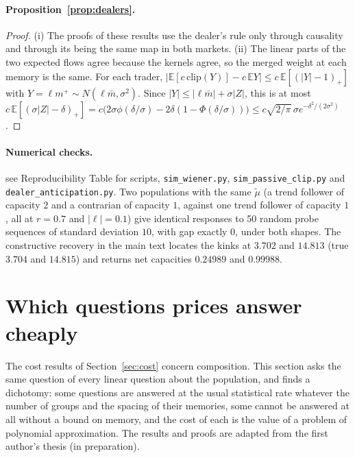 \documentclass[12pt]{article}
\theoremstyle{definition}
\theoremstyle{remark}
\begin{document}
\paragraph{Proposition~\ref{prop:dealers}.}
\begin{proof}
(i) The proofs of these results use the dealer's rule only through causality and through its being the same map in both markets. (ii) The linear parts of the two expected flows agree because the kernels agree, so the merged weight at each memory is the same. For each trader, $|\mathbb E[c\,\mathrm{clip}(Y)]-c\,\mathbb EY|\le c\,\mathbb E[(|Y|-1)_+]$ with $Y=\ell m^+\sim N(\ell\bar m,\sigma^2)$. Since $|Y|\le|\ell\bar m|+\sigma|Z|$, this is at most $c\,\mathbb E[(\sigma|Z|-\delta)_+]=c\bigl(2\sigma\phi(\delta/\sigma)-2\delta(1-\Phi(\delta/\sigma))\bigr)\le c\sqrt{2/\pi}\,\sigma e^{-\delta^2/(2\sigma^2)}$.
\end{proof}

\paragraph{Numerical checks.} see Reproducibility Table for scripts, \nolinkurl{sim_wiener.py}, \nolinkurl{sim_passive_clip.py} and \nolinkurl{dealer_anticipation.py}. Two populations with the same $\tilde\mu$ (a trend follower of capacity $2$ and a contrarian of capacity $1$, against one trend follower of capacity $1$, all at $r=0.7$ and $|\ell|=0.1$) give identical responses to 50 random probe sequences of standard deviation $10$, with gap exactly $0$, under both shapes. The constructive recovery in the main text locates the kinks at $3.702$ and $14.813$ (true $3.704$ and $14.815$) and returns net capacities $0.24989$ and $0.99988$.

\section{Which questions prices answer cheaply}\label{app:questions}

The cost results of Section~\ref{sec:cost} concern composition. This section asks the same question of every linear question about the population, and finds a dichotomy: some questions are answered at the usual statistical rate whatever the number of groups and the spacing of their memories, some cannot be answered at all without a bound on memory, and the cost of each is the value of a problem of polynomial approximation. The results and proofs are adapted from the first author's thesis (in preparation).
\end{document}
